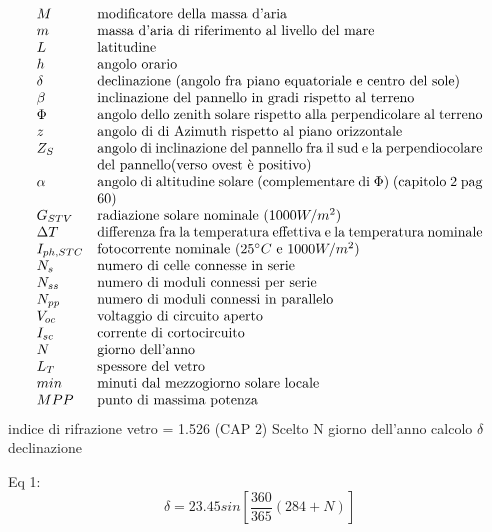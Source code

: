 \documentclass{article}
\begin{document}
\[\begin{array}{lp{0.8\linewidth}}
         M & modificatore della massa d'aria\\
         m & massa d'aria di riferimento al livello del mare\\
         L & latitudine\\
         h & angolo orario\\
         \delta & declinazione (angolo fra piano equatoriale e  centro del sole)\\
         \beta & inclinazione del pannello in gradi rispetto al terreno\\
         \Phi & angolo dello zenith solare rispetto alla perpendicolare al terreno\\
         z & angolo di di Azimuth rispetto al piano orizzontale\\
         Z_{S} &  angolo di inclinazione del pannello fra il sud e la perpendiocolare del pannello(verso ovest è positivo)\\
         \alpha & angolo di altitudine solare (complementare di $\Phi$) (capitolo 2 pag 60)\\
         G_{STV} & radiazione solare nominale $(1000W/m^{2})$\\
         \Delta T             & differenza fra la temperatura effettiva e la temperatura nominale\\
         I_{ph,STC}         &fotocorrente nominale $(25^{\circ}C$ e $1000W/m^{2})$\\
         N_{s} & numero di celle connesse in serie\\
         N_{ss} & numero di moduli connessi per serie\\
         N_{pp} & numero di moduli connessi in parallelo\\
         V_{oc} & voltaggio di circuito aperto\\
         I_{sc} & corrente di cortocircuito\\
         N & giorno dell'anno\\
         L_{T} & spessore del vetro\\
         min & minuti dal mezzogiorno solare locale\\
         MPP & punto di massima potenza
      \end{array}
   \]
indice di rifrazione vetro = 1.526  
(CAP 2)
Scelto N giorno dell'anno calcolo $\delta$ declinazione

Eq 1:
\begin{equation}
    \delta=23.45 sin \left[\frac{360}{365}(284+N)\right]
\end{equation}
\end{document}
